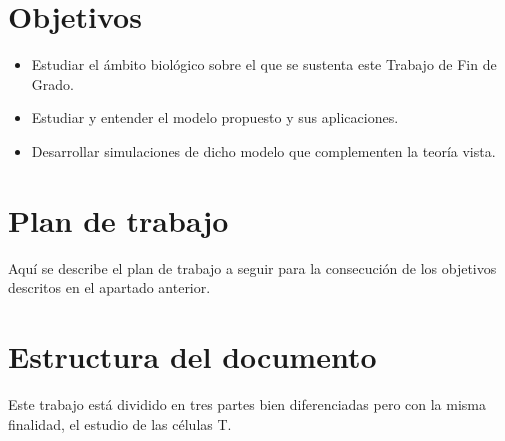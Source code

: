 \section{Objetivos}
 \begin{itemize}
 	\item Estudiar el ámbito biológico sobre el que se sustenta este Trabajo de Fin de Grado.
 	\item Estudiar y entender el modelo propuesto y sus aplicaciones. 
 	\item Desarrollar simulaciones de dicho modelo que complementen la teoría vista.
 \end{itemize}


\section{Plan de trabajo}
Aquí se describe el plan de trabajo a seguir para la consecución de los objetivos descritos en el apartado anterior.

\section{Estructura del documento}

Este trabajo está dividido en tres partes bien diferenciadas pero con la misma finalidad, el estudio de las células T. 


